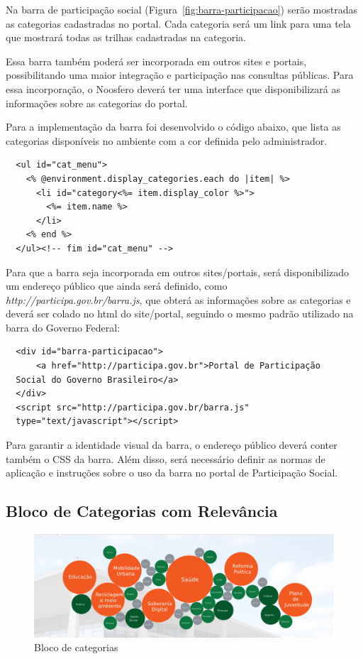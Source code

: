 \documentclass[[a4paper,11pt]{article}
\begin{document}
Na barra de participação social (Figura~\ref{fig:barra-participacao}) serão
mostradas as categorias
cadastradas no portal. Cada categoria será um link para uma tela que
mostrará todas as trilhas cadastradas na categoria.

Essa barra também poderá ser incorporada em outros sites e portais,
possibilitando uma maior integração e participação nas consultas
públicas.
Para essa incorporação, o Noosfero deverá ter uma interface que
disponibilizará as informações sobre as categorias do portal.

Para a implementação da barra foi desenvolvido o código abaixo, que
lista as categorias disponíveis no ambiente com a cor definida pelo
administrador.

{\scriptsize
  \begin{verbatim}
  <ul id="cat_menu">
    <% @environment.display_categories.each do |item| %>
      <li id="category<%= item.display_color %>">
        <%= item.name %>
      </li>
    <% end %>
  </ul><!-- fim id="cat_menu" -->
  \end{verbatim}
}

Para que a barra seja incorporada em outros sites/portais, será
disponibilizado um endereço
público que ainda será definido, como {\it
http://participa.gov.br/barra.js}, que obterá as informações
sobre as categorias e deverá ser colado no html do
site/portal,
seguindo o mesmo padrão utilizado na barra do Governo Federal:

{\scriptsize
  \begin{verbatim}
  <div id="barra-participacao">
      <a href="http://participa.gov.br">Portal de Participação
  Social do Governo Brasileiro</a>
  </div>
  <script src="http://participa.gov.br/barra.js"
  type="text/javascript"></script>
  \end{verbatim}
}

Para garantir a identidade visual da barra, o endereço público
deverá conter também o CSS da barra. Além disso, será necessário
definir as
normas de aplicação e instruções sobre o uso da barra no portal de
Participação Social.

\subsection{Bloco de Categorias com Relevância}

\begin{figure}[h]
\center
\includegraphics[scale=0.4]{bloco-categorias-bolas.png}
\caption{Bloco de categorias}
\label{fig:bloco-categorias-bolas}
\end{figure}
\end{document}
